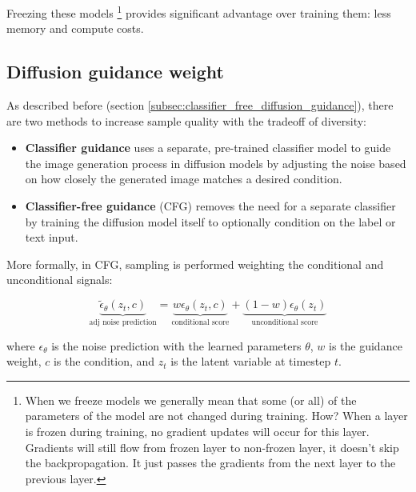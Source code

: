 Freezing these models \footnote{When we freeze models we generally mean that some (or all) of the parameters of the model are not changed during training. How? When a layer is frozen during training, no gradient updates will occur for this layer. Gradients will still flow from frozen layer to non-frozen layer, it doesn't skip the backpropagation. It just passes the gradients from the next layer to the previous layer.} provides significant advantage over training them: less memory and compute costs.














\subsection{Diffusion guidance weight}
\label{subsec:imagen_diffusion_guidance_weight}

As described before (section \ref{subsec:classifier_free_diffusion_guidance}), there are two methods to increase sample quality with the tradeoff of diversity:

\begin{itemize}
    \item \textbf{Classifier guidance} uses a separate, pre-trained classifier model to guide the image generation process in diffusion models by adjusting the noise based on how closely the generated image matches a desired condition.
    
    \item \textbf{Classifier-free guidance} (CFG) removes the need for a separate classifier by training the diffusion model itself to optionally condition on the label or text input.
\end{itemize}

More formally, in CFG, sampling is performed weighting the conditional and unconditional signals:

\begin{equation}
    \underbrace{\tilde{\epsilon}_\theta (z_t, c)}_{\text{adj noise prediction}} = \underbrace{w \epsilon_\theta (z_t, c)}_{\text{conditional score}} + \underbrace{(1 - w) \epsilon_\theta (z_t)}_{\text{unconditional score}}
    \label{eq:classifier_free_guidance}
\end{equation}

where $\epsilon_\theta$ is the noise prediction with the learned parameters $\theta$, $w$ is the guidance weight, $c$ is the condition, and $z_t$ is the latent variable at timestep $t$.

